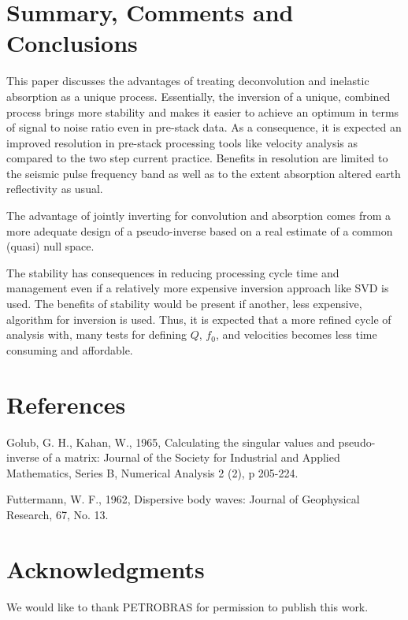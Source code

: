 \documentclass[twoside,letterpaper,twocolumn]{article}
\begin{document}
\section{Summary, Comments and Conclusions}

This paper discusses the advantages of treating deconvolution and inelastic absorption
as a unique process. Essentially, the inversion of a unique, combined process brings
more stability and makes it easier to achieve an optimum in terms of signal to noise
ratio even in pre-stack data. As a consequence, it is expected an improved resolution
in pre-stack processing tools like velocity analysis as compared to the two step current 
practice. Benefits in resolution are limited to the seismic pulse frequency band as well 
as to the extent absorption altered earth reflectivity as usual.

The advantage of jointly inverting for convolution and absorption comes
from a more adequate design of a pseudo-inverse based on a real estimate
of a common (quasi) null space. 

The stability has consequences in reducing processing cycle time and management even if a relatively 
more expensive inversion approach like SVD is used. The benefits of stability would be present if 
another, less expensive, algorithm for inversion is used. Thus, it is expected that a more refined
cycle of analysis with, many tests for defining $Q$, $f_0$, and velocities becomes less time 
consuming and affordable.

\section{References}

Golub, G. H., Kahan, W., 1965, Calculating the singular values and pseudo-inverse of a matrix:
Journal of the Society for Industrial and Applied Mathematics, Series B, Numerical Analysis 2 (2), p 205-224.

Futtermann, W. F., 1962, Dispersive body waves: Journal of Geophysical Research, 67, No. 13.

\section{Acknowledgments}

We would like to thank PETROBRAS for permission to publish this work.
\end{document}
